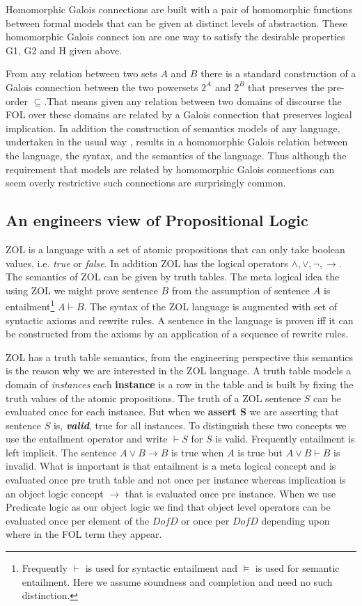 Homomorphic Galois connections are built with  a pair of homomorphic functions between formal models that can be given at distinct levels of abstraction. These homomorphic Galois connect ion are one way to  satisfy the desirable properties G1, G2 and H given above. 


From any relation between two sets $A$ and $B$ there is a standard construction of a Galois connection between the two powersets $2^A$ and $2^B$ that preserves the pre-order $\subseteq$.That means given any relation between two domains of discourse the FOL over these domains are related by a Galois connection that preserves logical implication. In addition the  construction of semantics models of any language, undertaken in the usual way \cite{GaloisPeter}, results in a homomorphic Galois relation between the language, the syntax, and the semantics of the language. Thus although the requirement that models are related by homomorphic Galois connections can seem overly restrictive such connections are surprisingly common.




\subsection{An engineers view of Propositional Logic}\label{sec:ZOL}
ZOL is a language with a set of atomic propositions that can only  take boolean values, i.e. \emph{true} or \emph{false}. In addition ZOL  has the logical operators $\wedge,\vee,\neg,\rightarrow$. The semantics of ZOL can be given by truth tables. The meta logical idea the using ZOL we might prove sentence $B$ from the assumption of sentence $A$ is entailment\footnote{Frequently $\vdash$ is used for  syntactic entailment and $\vDash$ is used for semantic entailment. Here we assume soundness and completion and need no such distinction.}  $A\vdash B$. The syntax of the ZOL language is augmented with  set of syntactic axioms and rewrite rules. A sentence in the language is proven iff it can be constructed from the axioms by an application of a sequence of rewrite rules.

ZOL has a truth table semantics, from the engineering perspective this semantics is the reason why we are interested in the ZOL language. A truth table models a domain of \emph{instances} each {\bf instance} is a row in the table and is built by fixing the truth values of the atomic propositions.  The truth of a ZOL sentence $S$  can be evaluated once for each instance. But when we {\bf assert S}  we are asserting that sentence $S$ is, \emph{\bf valid}, true for all instances. To distinguish these two concepts we use the entailment operator and  write $\vdash S$ for $S$ is valid.  Frequently  entailment is left implicit\label{sec:implicit}.  The sentence $A\vee B \rightarrow B$ is true when $A$ is true but $A\vee B \vdash B$ is invalid.  What is important is that entailment is a  meta logical concept and   is evaluated once pre truth table and  not once per instance whereas implication is an object logic concept $\rightarrow$ that is evaluated once pre instance. When we use Predicate logic as our object logic we find that object level operators can be evaluated once per element of the $DofD$ or once per $DofD$ depending upon where in the FOL term they appear.

